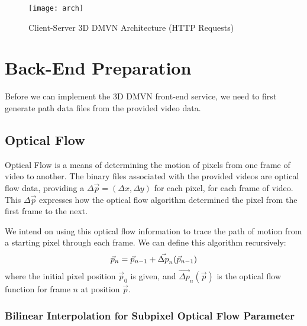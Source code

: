 \begin{figure}[h]
\centering
\texttt{[image: arch]}
\caption{Client-Server 3D DMVN Architecture (HTTP Requests)}
\end{figure}

\section{Back-End Preparation}
Before we can implement the 3D DMVN front-end service, we need to first generate path data files from the provided video data.

\subsection{Optical Flow}
Optical Flow is a means of determining the motion of pixels from one frame of video to another. The binary files associated with the provided videos are optical flow data, providing a $\Delta \vec{p} = (\Delta x, \Delta y)$ for each pixel, for each frame of video. This $\Delta \vec{p}$ expresses how the optical flow algorithm determined the pixel from the first frame to the next.
\par We intend on using this optical flow information to trace the path of motion from a starting pixel through each frame. We can define this algorithm recursively:
\begin{equation}
    \vec{p}_n = \vec{p}_{n-1} + \vec{\Delta p}_n(\vec{p}_{n-1}) \\
\end{equation}
where the initial pixel position $\vec{p}_0$ is given, and $\vec{\Delta p}_n(\vec{p})$ is the optical flow function for frame $n$ at position $\vec{p}$.

\subsubsection{Bilinear Interpolation for Subpixel Optical Flow Parameter}

